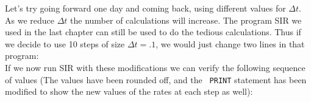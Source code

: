 Let's try going forward one day and coming back, using different
values for $\Delta t$.  As we reduce $\Delta t$ the number of
calculations will increase.  The program SIR we used in the last
chapter can still be used to do the tedious calculations.  Thus if we
decide to use 10 steps of size $\Delta t=.1$, we would just change two
lines in that program: 
\\
If we now run SIR with these modifications we can verify the following
sequence of values (The values have been rounded off, and the {\tt
  PRINT} statement has been modified to show the new values of the
rates at each step as well):
\hspace*{-.25in}
